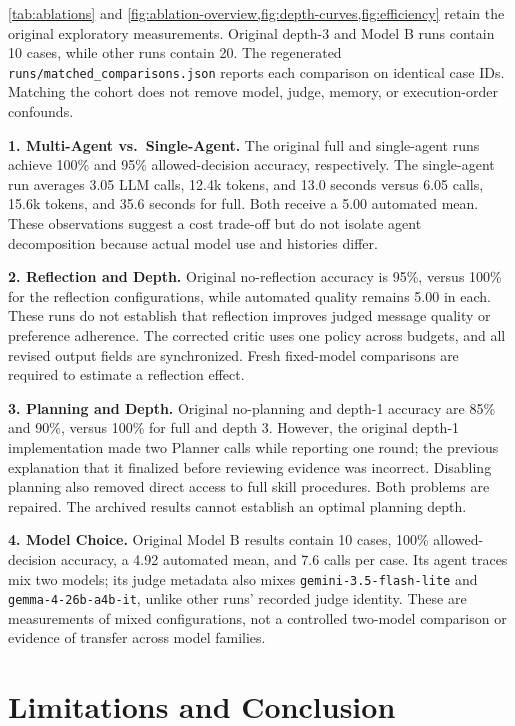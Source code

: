 \documentclass{article}
\begin{document}
\cref{tab:ablations} and \cref{fig:ablation-overview,fig:depth-curves,fig:efficiency} retain the original exploratory measurements. Original depth-3 and Model B runs contain 10 cases, while other runs contain 20. The regenerated \texttt{runs/matched\_comparisons.json} reports each comparison on identical case IDs. Matching the cohort does not remove model, judge, memory, or execution-order confounds.

\textbf{1. Multi-Agent vs.\ Single-Agent.} The original full and single-agent runs achieve 100\% and 95\% allowed-decision accuracy, respectively. The single-agent run averages 3.05 LLM calls, 12.4k tokens, and 13.0 seconds versus 6.05 calls, 15.6k tokens, and 35.6 seconds for full. Both receive a 5.00 automated mean. These observations suggest a cost trade-off but do not isolate agent decomposition because actual model use and histories differ.

\textbf{2. Reflection and Depth.} Original no-reflection accuracy is 95\%, versus 100\% for the reflection configurations, while automated quality remains 5.00 in each. These runs do not establish that reflection improves judged message quality or preference adherence. The corrected critic uses one policy across budgets, and all revised output fields are synchronized. Fresh fixed-model comparisons are required to estimate a reflection effect.

\textbf{3. Planning and Depth.} Original no-planning and depth-1 accuracy are 85\% and 90\%, versus 100\% for full and depth 3. However, the original depth-1 implementation made two Planner calls while reporting one round; the previous explanation that it finalized before reviewing evidence was incorrect. Disabling planning also removed direct access to full skill procedures. Both problems are repaired. The archived results cannot establish an optimal planning depth.

\textbf{4. Model Choice.} Original Model B results contain 10 cases, 100\% allowed-decision accuracy, a 4.92 automated mean, and 7.6 calls per case. Its agent traces mix two models; its judge metadata also mixes \texttt{gemini-3.5-flash-lite} and \texttt{gemma-4-26b-a4b-it}, unlike other runs' recorded judge identity. These are measurements of mixed configurations, not a controlled two-model comparison or evidence of transfer across model families.

\section{Limitations and Conclusion}
\label{sec:conclusion}
\end{document}
